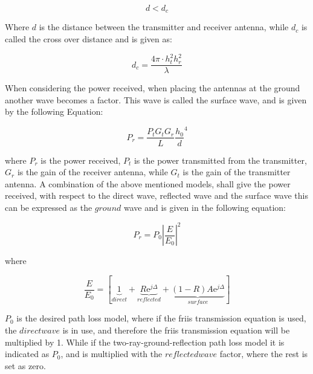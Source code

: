 


\begin{equation}
d < d_{c}
\label{two_ray_cond}
\end{equation}

Where $d$ is the distance between the transmitter and receiver antenna, while $d_{c}$ is called the cross over distance and is given as:

\begin{equation}
d_{c} = \frac{4\pi \cdot h^2_t h^2_r }{\lambda}
\label{two_ray_cross_dis}
\end{equation}  

When considering the power received, when placing the antennas at the ground another wave becomes a factor. This wave is called the surface wave, and is given by the following Equation:

\begin{equation}
P_r=\frac{P_t G_t G_r }{L}\frac{h_0}{d}^4
\label{surface_wave}
\end{equation}

where $P_{r}$ is the power received, $P_{t}$ is the power transmitted from the transmitter, $G_{r}$ is the gain of the receiver antenna, while $G_{t}$ is the gain of the transmitter antenna. A combination of the above mentioned models, shall give the power received, with respect to the direct wave, reflected wave and the surface wave this can be expressed as the $ground$ wave and is given in the following equation:


\begin{equation}
P_r=P_0 \left|\frac{E}{E_0}\right|^2 
\label{ground_wave}
\end{equation}

where

\begin{equation}
\frac{E}{E_{0}}=[\underbrace{1}_{direct}+\underbrace{R\text{e}^{j\Delta}}_{reflected}+\underbrace{(1-R)A\text{e}^{j\Delta}}_{surface}]
\end{equation}

$P_{0}$ is the desired path loss model, where if the friis transmission equation is used, the $direct wave$ is in use, and therefore the friis transmission equation will be multiplied by 1. While if the two-ray-ground-reflection path loss model it is indicated as $P_{0}$, and is multiplied with the $reflected wave$ factor, where the rest is set as zero. 




